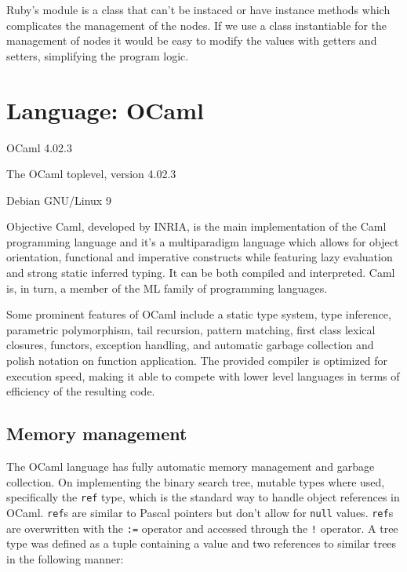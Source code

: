 \documentclass[11pt]{scrartcl} %
\begin{document}
Ruby's module is a class that can't be instaced or have instance methods which complicates the management of the nodes. If we use a class instantiable for the management of nodes it would be easy to modify the values with getters and setters, simplifying the program logic.

\section{Language: OCaml}

\begin{description}[align=left,labelwidth=10em]
\item [Language Version] OCaml 4.02.3
\item [Interpreter] The OCaml toplevel, version 4.02.3
\item [Operating System] Debian GNU/Linux 9
\end{description}

Objective Caml, developed by INRIA, is the main implementation of the Caml programming language and it's a multiparadigm language which allows for object orientation, functional and imperative constructs while featuring lazy evaluation and strong static inferred typing. It can be both compiled and interpreted. Caml is, in turn, a member of the ML family of programming languages.

Some prominent features of OCaml include a static type system, type inference, parametric polymorphism, tail recursion, pattern matching, first class lexical closures, functors, exception handling, and automatic garbage collection and polish notation on function application. The provided compiler is optimized for execution speed, making it able to compete with lower level languages in terms of efficiency of the resulting code.

\subsection*{Memory management}

The OCaml language has fully automatic memory management and garbage collection. On implementing the binary search tree, mutable types where used, specifically the \texttt{ref} type, which is the standard way to handle object references in OCaml. \texttt{ref}s are similar to Pascal pointers but don't allow for \texttt{null} values. \texttt{ref}s are overwritten with the \texttt{:=} operator and accessed through the \texttt{!} operator. A tree type was defined as a tuple containing a value and two references to similar trees in the following manner:
\end{document}
